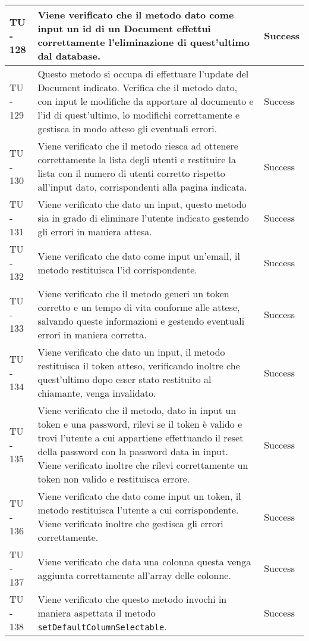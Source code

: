 \begin{center}
\begin{longtable}{ | p{3cm} | p{9cm} | p{2cm} | }
TU - 128 & Viene verificato che il metodo dato come input un id di un Document effettui correttamente l'eliminazione di quest'ultimo dal database. & Success \\ \hline
TU - 129 & Questo metodo si occupa di effettuare l'update del Document indicato.
Verifica che il metodo dato, con input le modifiche da apportare al documento e l'id di quest'ultimo, lo modifichi correttamente e gestisca in modo atteso gli eventuali errori. & Success \\ \hline
TU - 130 & Viene verificato che il metodo riesca ad ottenere correttamente la lista degli utenti e restituire la lista con il numero di utenti corretto rispetto all'input dato, corrispondenti alla pagina indicata. & Success \\ \hline
TU - 131 & Viene verificato che dato un input, questo metodo sia in grado di eliminare l'utente indicato gestendo gli errori in maniera attesa. & Success \\ \hline
TU - 132 & Viene verificato che dato come input un'email, il metodo restituisca l'id corrispondente. & Success \\ \hline
TU - 133 & Viene verificato che il metodo generi un token corretto e un tempo di vita conforme alle attese, salvando queste informazioni e gestendo eventuali errori in maniera corretta. & Success \\ \hline
TU - 134 & Viene verificato che dato un input, il metodo restituisca il token atteso, verificando inoltre che quest'ultimo dopo esser stato restituito al chiamante, venga invalidato.
 & Success \\ \hline
TU - 135 & Viene verificato che il metodo, dato in input un token e una password, rilevi se il token è valido e trovi l'utente a cui appartiene effettuando il reset della password con la password data in input.
Viene verificato inoltre che rilevi correttamente un token non valido e restituisca errore. & Success \\ \hline
TU - 136 & Viene verificato che dato come input un token, il metodo restituisca l'utente a cui corrispondente.
Viene verificato inoltre che gestisca gli errori correttamente. & Success \\ \hline
TU - 137 & Viene verificato che data una colonna questa venga aggiunta correttamente all'array delle colonne. & Success \\ \hline
TU - 138 & Viene verificato che questo metodo invochi in maniera aspettata il metodo \texttt{setDefaultColumnSelectable}. & Success \\ \hline

\end{longtable}
\end{center}
